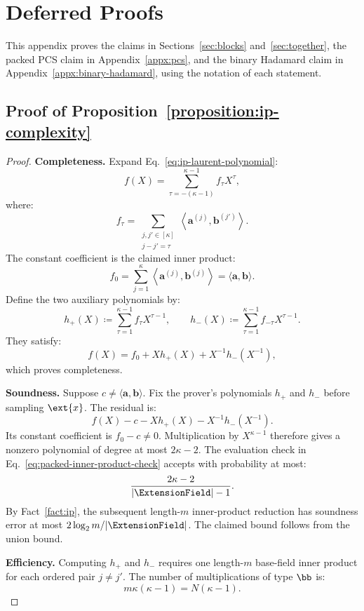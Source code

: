 \section{Deferred Proofs}
\label{appx:proof}
\label{appx:auxiliary-proofs}

This appendix proves the claims in Sections~\ref{sec:blocks}
and~\ref{sec:together}, the packed PCS claim in
Appendix~\ref{appx:pcs}, and the binary Hadamard claim in
Appendix~\ref{appx:binary-hadamard}, using the notation of each statement.

\subsection{Proof of Proposition~\ref{proposition:ip-complexity}}
\label{appx:proof-ip}

\begin{proof}
\noindent\textbf{Completeness.}
Expand Eq.~\eqref{eq:ip-laurent-polynomial}:
\[
    f(X)
    =
    \sum_{\tau=-(\kappa-1)}^{\kappa-1}
    f_\tau X^\tau,
\]
where:
\[
    f_\tau
    =
    \sum_{\substack{j,j'\in[\kappa]\\j-j'=\tau}}
    \left\langle
        \bm a^{(j)},\bm b^{(j')}
    \right\rangle.
\]
The constant coefficient is the claimed inner product:
\[
    f_0
    =
    \sum_{j=1}^{\kappa}
    \left\langle
        \bm a^{(j)},\bm b^{(j)}
    \right\rangle
    =
    \langle\bm a,\bm b\rangle.
\]
Define the two auxiliary polynomials by:
\[
    h_+(X)
    \coloneqq
    \sum_{\tau=1}^{\kappa-1}
    f_\tau X^{\tau-1},
    \qquad
    h_-(X)
    \coloneqq
    \sum_{\tau=1}^{\kappa-1}
    f_{-\tau}X^{\tau-1}.
\]
They satisfy:
\[
    f(X)
    =
    f_0
    +Xh_+(X)
    +X^{-1}h_-(X^{-1}),
\]
which proves completeness.

\smallskip\noindent\textbf{Soundness.}
Suppose \(c\neq\langle\bm a,\bm b\rangle\). Fix the prover's
polynomials \(h_+\) and \(h_-\) before sampling \(\ext{x}\).
The residual is:
\[
    f(X)-c-Xh_+(X)-X^{-1}h_-(X^{-1}).
\]
Its constant coefficient is \(f_0-c\neq0\). Multiplication by
\(X^{\kappa-1}\) therefore gives a nonzero polynomial of degree
at most \(2\kappa-2\). The evaluation check in
Eq.~\eqref{eq:packed-inner-product-check} accepts with probability
at most:
\[
    \frac{2\kappa-2}{|\ExtensionField|-1}.
\]
By Fact~\ref{fact:ip}, the subsequent length-\(m\)
inner-product reduction has soundness error at most
\(2\log_2m/|\ExtensionField|\). The claimed bound follows from
the union bound.

\smallskip\noindent\textbf{Efficiency.}
Computing \(h_+\) and \(h_-\) requires one length-\(m\)
base-field inner product for each ordered pair \(j\neq j'\).
The number of multiplications of type \(\bb\) is:
\[
    m\kappa(\kappa-1)
    =
    N(\kappa-1).
\]


\end{proof}
